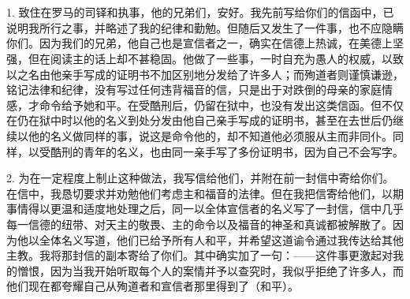 

\section{}

\par

\par

1. 致住在罗马的司铎和执事，他的兄弟们，安好。我先前写给你们的信函中，已说明我所行之事，并略述了我的纪律和勤勉。但随后又发生了一件事，也不应隐瞒你们。因为我们的兄弟，他自己也是宣信者之一，确实在信德上热诚，在美德上坚强，但在阅读主的话上却不甚稳固。他做了一些事，一时自充为愚人的权威，以致以之名由他亲手写成的证明书不加区别地分发给了许多人；而殉道者则谨慎谦逊，铭记法律和纪律，没有写过任何违背福音的信，只是出于对跌倒的母亲的家庭情感，才命令给予她和平。在受酷刑后，仍留在狱中，也没有发出这类信函。但不仅在仍在狱中时以他的名义到处分发由他自己亲手写成的证明书，甚至在去世后仍继续以他的名义做同样的事，说这是命令他的，却不知道他必须服从主而非同仆。同样，以受酷刑的青年的名义，也由同一亲手写了多份证明书，因为自己不会写字。\par

2. 为在一定程度上制止这种做法，我写信给他们，并附在前一封信中寄给你们。在信中，我恳切要求并劝勉他们考虑主和福音的法律。但在我把信寄给他们，以期事情得以更温和适度地处理之后，同一以全体宣信者的名义写了一封信，信中几乎每一信德的纽带、对天主的敬畏、主的命令以及福音的神圣和真诚都被解散了。因为他以全体名义写道，他们已给予所有人和平，并希望这道谕令通过我传达给其他主教。我将那封信的副本寄给了你们。其中确实加了一句：——这件事更激起对我的憎恨，因为当我开始听取每个人的案情并予以查究时，我似乎拒绝了许多人，而他们现在都夸耀自己从殉道者和宣信者那里得到了（和平）。\par

